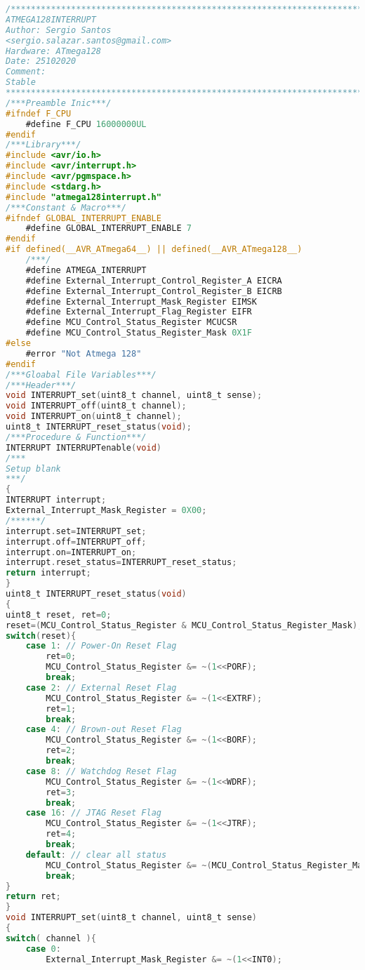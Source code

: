 \begin{lstlisting}[language=C, caption={atmega128interrupt.c}, label=atmega128interrupt-c, captionpos=b]
/*************************************************************************
ATMEGA128INTERRUPT
Author: Sergio Santos 
<sergio.salazar.santos@gmail.com>
Hardware: ATmega128
Date: 25102020
Comment:
Stable
*************************************************************************/
/***Preamble Inic***/
#ifndef F_CPU
	#define F_CPU 16000000UL
#endif
/***Library***/
#include <avr/io.h>
#include <avr/interrupt.h>
#include <avr/pgmspace.h>
#include <stdarg.h>
#include "atmega128interrupt.h"
/***Constant & Macro***/
#ifndef GLOBAL_INTERRUPT_ENABLE
	#define GLOBAL_INTERRUPT_ENABLE 7
#endif
#if defined(__AVR_ATmega64__) || defined(__AVR_ATmega128__)	
	/***/
	#define ATMEGA_INTERRUPT
	#define External_Interrupt_Control_Register_A EICRA
	#define External_Interrupt_Control_Register_B EICRB
	#define External_Interrupt_Mask_Register EIMSK
	#define External_Interrupt_Flag_Register EIFR
	#define MCU_Control_Status_Register MCUCSR
	#define MCU_Control_Status_Register_Mask 0X1F
#else
	#error "Not Atmega 128"
#endif
/***Gloabal File Variables***/
/***Header***/
void INTERRUPT_set(uint8_t channel, uint8_t sense);
void INTERRUPT_off(uint8_t channel);
void INTERRUPT_on(uint8_t channel);
uint8_t INTERRUPT_reset_status(void);
/***Procedure & Function***/
INTERRUPT INTERRUPTenable(void)
/***
Setup blank
***/
{
INTERRUPT interrupt;
External_Interrupt_Mask_Register = 0X00;
/******/
interrupt.set=INTERRUPT_set;
interrupt.off=INTERRUPT_off;
interrupt.on=INTERRUPT_on;
interrupt.reset_status=INTERRUPT_reset_status;
return interrupt;
}
uint8_t INTERRUPT_reset_status(void)
{
uint8_t reset, ret=0;
reset=(MCU_Control_Status_Register & MCU_Control_Status_Register_Mask);
switch(reset){
	case 1: // Power-On Reset Flag
		ret=0;
		MCU_Control_Status_Register &= ~(1<<PORF);
		break;
	case 2: // External Reset Flag
		MCU_Control_Status_Register &= ~(1<<EXTRF);
		ret=1;
		break;
	case 4: // Brown-out Reset Flag
		MCU_Control_Status_Register &= ~(1<<BORF);
		ret=2;
		break;
	case 8: // Watchdog Reset Flag
		MCU_Control_Status_Register &= ~(1<<WDRF);
		ret=3;
		break;
	case 16: // JTAG Reset Flag
		MCU_Control_Status_Register &= ~(1<<JTRF);
		ret=4;
		break;
	default: // clear all status
		MCU_Control_Status_Register &= ~(MCU_Control_Status_Register_Mask);
		break;
}
return ret;
}
void INTERRUPT_set(uint8_t channel, uint8_t sense)
{
switch( channel ){
	case 0: 
		External_Interrupt_Mask_Register &= ~(1<<INT0);

\end{lstlisting}
